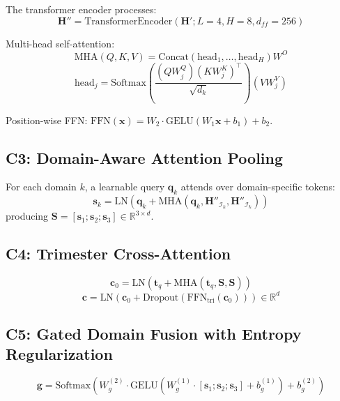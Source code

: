\documentclass[12pt,a4paper]{article}
\begin{document}
The transformer encoder processes:
\begin{equation}
\mathbf{H}'' = \text{TransformerEncoder}(\mathbf{H}'; L=4, H=8, d_{ff}=256)
\end{equation}

Multi-head self-attention:
\begin{equation}
\text{MHA}(Q, K, V) = \text{Concat}(\text{head}_1, \ldots, \text{head}_H) W^O
\end{equation}
\begin{equation}
\text{head}_j = \text{Softmax}\left(\frac{(QW_j^Q)(KW_j^K)^\top}{\sqrt{d_k}}\right)(VW_j^V)
\end{equation}

Position-wise FFN: $\text{FFN}(\mathbf{x}) = W_2 \cdot \text{GELU}(W_1 \mathbf{x} + b_1) + b_2$.

\subsection{C3: Domain-Aware Attention Pooling}

For each domain $k$, a learnable query $\mathbf{q}_k$ attends over domain-specific tokens:
\begin{equation}
\mathbf{s}_k = \text{LN}\left(\mathbf{q}_k + \text{MHA}(\mathbf{q}_k, \mathbf{H}''_{\mathcal{I}_k}, \mathbf{H}''_{\mathcal{I}_k})\right)
\end{equation}
producing $\mathbf{S} = [\mathbf{s}_1; \mathbf{s}_2; \mathbf{s}_3] \in \mathbb{R}^{3 \times d}$.

\subsection{C4: Trimester Cross-Attention}
\begin{equation}
\mathbf{c}_0 = \text{LN}(\mathbf{t}_q + \text{MHA}(\mathbf{t}_q, \mathbf{S}, \mathbf{S}))
\end{equation}
\begin{equation}
\mathbf{c} = \text{LN}(\mathbf{c}_0 + \text{Dropout}(\text{FFN}_{\text{tri}}(\mathbf{c}_0))) \in \mathbb{R}^d
\end{equation}

\subsection{C5: Gated Domain Fusion with Entropy Regularization}
\begin{equation}
\mathbf{g} = \text{Softmax}\left(W_g^{(2)} \cdot \text{GELU}\left(W_g^{(1)} \cdot [\mathbf{s}_1; \mathbf{s}_2; \mathbf{s}_3] + b_g^{(1)}\right) + b_g^{(2)}\right)
\end{equation}
\end{document}
